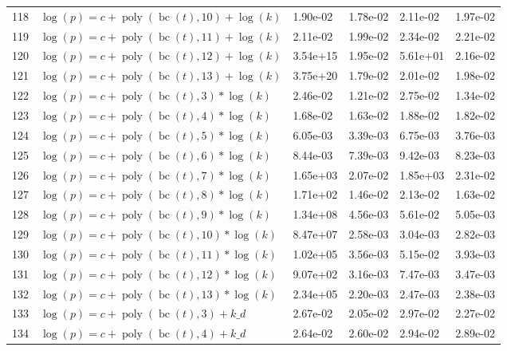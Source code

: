 \documentclass[12pt,a4paper]{article}
\DeclareMathOperator{\bc}{bc}
\DeclareMathOperator{\poly}{poly}
\begin{document}
\begin{longtable}[t]{ll>{\raggedleft\arraybackslash}p{2cm}>{\raggedleft\arraybackslash}p{2cm}>{\raggedleft\arraybackslash}p{2cm}>{\raggedleft\arraybackslash}p{2cm}}
118 & $\log(p) = c + \poly\left( \bc(t), 10 \right) + \log(k)$ & 1.90e-02 & 1.78e-02 & 2.11e-02 & 1.97e-02\\
\rowcolor{gray!6}  119 & $\log(p) = c + \poly\left( \bc(t), 11 \right) + \log(k)$ & 2.11e-02 & 1.99e-02 & 2.34e-02 & 2.21e-02\\
120 & $\log(p) = c + \poly\left( \bc(t), 12 \right) + \log(k)$ & 3.54e+15 & 1.95e-02 & 5.61e+01 & 2.16e-02\\
\rowcolor{gray!6}  121 & $\log(p) = c + \poly\left( \bc(t), 13 \right) + \log(k)$ & 3.75e+20 & 1.79e-02 & 2.01e-02 & 1.98e-02\\
122 & $\log(p) = c + \poly\left( \bc(t), 3 \right) * \log(k)$ & 2.46e-02 & 1.21e-02 & 2.75e-02 & 1.34e-02\\
\rowcolor{gray!6}  123 & $\log(p) = c + \poly\left( \bc(t), 4 \right) * \log(k)$ & 1.68e-02 & 1.63e-02 & 1.88e-02 & 1.82e-02\\
124 & $\log(p) = c + \poly\left( \bc(t), 5 \right) * \log(k)$ & 6.05e-03 & 3.39e-03 & 6.75e-03 & 3.76e-03\\
\rowcolor{gray!6}  125 & $\log(p) = c + \poly\left( \bc(t), 6 \right) * \log(k)$ & 8.44e-03 & 7.39e-03 & 9.42e-03 & 8.23e-03\\
126 & $\log(p) = c + \poly\left( \bc(t), 7 \right) * \log(k)$ & 1.65e+03 & 2.07e-02 & 1.85e+03 & 2.31e-02\\
\rowcolor{gray!6}  127 & $\log(p) = c + \poly\left( \bc(t), 8 \right) * \log(k)$ & 1.71e+02 & 1.46e-02 & 2.13e-02 & 1.63e-02\\
128 & $\log(p) = c + \poly\left( \bc(t), 9 \right) * \log(k)$ & 1.34e+08 & 4.56e-03 & 5.61e-02 & 5.05e-03\\
\rowcolor{gray!6}  129 & $\log(p) = c + \poly\left( \bc(t), 10 \right) * \log(k)$ & 8.47e+07 & 2.58e-03 & 3.04e-03 & 2.82e-03\\
130 & $\log(p) = c + \poly\left( \bc(t), 11 \right) * \log(k)$ & 1.02e+05 & 3.56e-03 & 5.15e-02 & 3.93e-03\\
\rowcolor{gray!6}  131 & $\log(p) = c + \poly\left( \bc(t), 12 \right) * \log(k)$ & 9.07e+02 & 3.16e-03 & 7.47e-03 & 3.47e-03\\
132 & $\log(p) = c + \poly\left( \bc(t), 13 \right) * \log(k)$ & 2.34e+05 & 2.20e-03 & 2.47e-03 & 2.38e-03\\
\rowcolor{gray!6}  133 & $\log(p) = c + \poly\left( \bc(t), 3 \right) + k\_d$ & 2.67e-02 & 2.05e-02 & 2.97e-02 & 2.27e-02\\
134 & $\log(p) = c + \poly\left( \bc(t), 4 \right) + k\_d$ & 2.64e-02 & 2.60e-02 & 2.94e-02 & 2.89e-02\\

\end{longtable}
\end{document}
